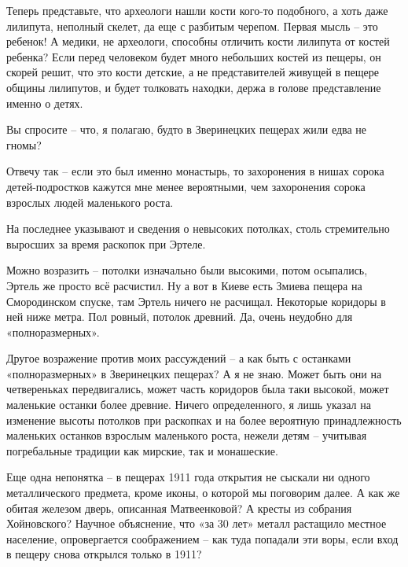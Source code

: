 Теперь представьте, что археологи нашли кости кого-то подобного, а хоть даже лилипута, неполный скелет, да еще с разбитым черепом. Первая мысль – это ребенок! А медики, не археологи, способны отличить кости лилипута от костей ребенка? Если перед человеком будет много небольших костей из пещеры, он скорей решит, что это кости детские, а не представителей живущей в пещере общины лилипутов, и будет толковать находки, держа в голове представление именно о детях.

Вы спросите – что, я полагаю, будто в Зверинецких пещерах жили едва не гномы?

Отвечу так – если это был именно монастырь, то захоронения в нишах сорока детей-подростков кажутся мне менее вероятными, чем захоронения сорока взрослых людей маленького роста.

На последнее указывают и сведения о невысоких потолках, столь стремительно выросших за время раскопок при Эртеле.

Можно возразить – потолки изначально были высокими, потом осыпались, Эртель же просто всё расчистил. Ну а вот в Киеве есть Змиева пещера на Смородинском спуске, там Эртель ничего не расчищал. Некоторые коридоры в ней ниже метра. Пол ровный, потолок древний. Да, очень неудобно для «полноразмерных».

Другое возражение против моих рассуждений – а как быть с останками «полноразмерных» в Зверинецких пещерах? А я не знаю. Может быть они на четвереньках передвигались, может  часть коридоров была таки высокой, может маленькие останки более древние. Ничего определенного, я лишь указал на изменение высоты потолков при раскопках и на более вероятную принадлежность маленьких останков взрослым маленького роста, нежели детям – учитывая погребальные традиции как мирские, так и монашеские.

Еще одна непонятка – в пещерах 1911 года открытия не сыскали ни одного металлического предмета, кроме иконы, о которой мы поговорим далее. А как же обитая железом дверь, описанная Матвеенковой? А кресты из собрания Хойновского? Научное объяснение, что «за 30 лет» металл растащило местное население, опровергается соображением – как туда попадали эти воры, если вход в пещеру снова открылся только в 1911?


